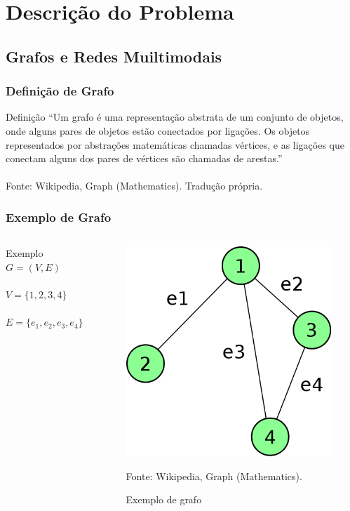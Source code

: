 \section{Descrição do Problema}

\subsection{Grafos e Redes Muiltimodais}

\frame
{
\frametitle{Definição de Grafo}
\begin{block}{Definição}
``Um grafo é uma representação abstrata de um conjunto de objetos, onde alguns pares de objetos estão conectados por ligações.
Os objetos representados por abstrações matemáticas chamadas vértices, e as ligações que conectam alguns dos pares de vértices são chamadas de arestas.''
\\ ~ \\
\tiny
Fonte: Wikipedia, Graph (Mathematics). Tradução própria.
\end{block}
}

\frame
{
\frametitle{Exemplo de Grafo}
\begin{columns}[c]
\column{1.5in}
	\begin{exampleblock}{Exemplo}
		$G = (V,E)$ \\
		$ $ \\
		$V = \{1,2,3,4\}$ \\
		$ $ \\
		$E = \{e_1,e_2,e_3,e_4\}$ 
	\end{exampleblock}
\column{1.5in}
	\begin{figure}
		\includegraphics[width=\textwidth]{./imgs/grafo.png}
		\caption{Exemplo de grafo}
		\tiny
		Fonte: Wikipedia, Graph (Mathematics).
	\end{figure}
\end{columns}
}

